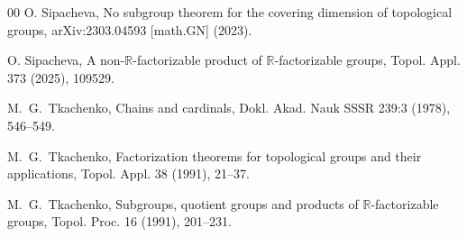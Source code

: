 \documentclass[a4paper,12pt]{amsart}
\theoremstyle{definition}
\theoremstyle{remark}
\begin{document}
\begin{thebibliography}{00}
O. Sipacheva, 
No subgroup theorem for the covering dimension of topological groups, 
arXiv:2303.04593 [math.GN] (2023).

O. Sipacheva, 
A non-$\mathbb R$-factorizable product of $\mathbb R$-factorizable groups, 
Topol. Appl. 373 (2025), 109529.

M.~G.~Tkachenko, 
Chains and cardinals, 
Dokl. Akad. Nauk SSSR
239:3 (1978),
546--549. 

M.~G.~Tkachenko, 
Factorization theorems for topological groups and their applications,  
Topol. Appl. 
38 (1991), 
21--37. 

M.~G.~Tkachenko,
Subgroups, quotient groups and
products of $\mathbb R$-factorizable groups, 
Topol. Proc. 16 (1991), 201--231.

\bigskip

\end{thebibliography}
\end{document}
